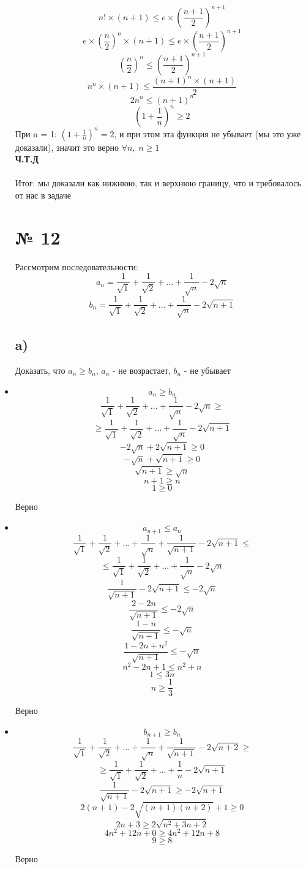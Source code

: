 \documentclass[a4paper,12pt]{article}
\begin{document}
\begin{itemize}
\[\]
\[
n! \times (n+1) \leq e \times \left(\frac{n+1}{2}\right)^{n+1}
\]
\[
e \times \left( \frac{n}{2}\right) ^ n \times (n+1) \leq e \times \left(\frac{n+1}{2}\right)^{n+1}
\]
\[
\left( \frac{n}{2}\right) ^ n \leq  \left(\frac{n+1}{2}\right)^{n+1}
\]
\[
n^n \times (n+1) \leq \frac{(n+1)^n \times(n+1)}{2}
\]
\[
2n^n \leq (n+1)^n
\]
\[
\left(1+\frac{1}{n}\right) ^ n \geq 2
\]
При n = 1: $\left(1+\frac{1}{n}\right) ^ n = 2$, и при этом эта функция не убывает (мы это уже доказали), значит это верно $\forall n, \; n \geq 1$\\
\textbf{Ч.Т.Д}
\\\\
Итог: мы доказали как нижнюю, так и верхнюю границу, что и требовалось от нас в задаче
\section*{№ 12}
Рассмотрим последовательности:
\[
a_n = \frac{1}{\sqrt{1}} + \frac{1}{\sqrt{2}} + \ldots + \frac{1}{\sqrt{n}} - 2\sqrt{n}
\]
\[
b_n = \frac{1}{\sqrt{1}} + \frac{1}{\sqrt{2}} + \ldots + \frac{1}{\sqrt{n}} -2 \sqrt{n+1}
\]
\subsection*{a)}
Доказать, что $a_n \geq b_n $, $a_n$ - не возрастает, $b_n$ - не убывает
\item \[
a_n \geq b_n
\]
\[
\frac{1}{\sqrt{1}} + \frac{1}{\sqrt{2}} + \ldots + \frac{1}{\sqrt{n}} - 2\sqrt{n} \geq
\]
\[
\geq \frac{1}{\sqrt{1}} + \frac{1}{\sqrt{2}} + \ldots + \frac{1}{\sqrt{n}} -2 \sqrt{n+1}
\]
\[
-2\sqrt{n} + 2\sqrt{n+1} \geq 0
\]
\[
-\sqrt{n} + \sqrt{n+1} \geq 0
\]
\[
\sqrt{n+1} \geq \sqrt{n}
\]
\[
n+1 \geq n
\]
\[
1 \geq 0
\]
\begin{center}
Верно
\end{center}
\item
\[
a_{n+1} \leq a_n
\]
\[
\frac{1}{\sqrt{1}} + \frac{1}{\sqrt{2}} + \ldots + \frac{1}{\sqrt{n}} + \frac{1}{\sqrt{n+1}}- 2\sqrt{n+1} \leq 
\]
\[
\leq \frac{1}{\sqrt{1}} + \frac{1}{\sqrt{2}} + \ldots + \frac{1}{\sqrt{n}} -2 \sqrt{n}
\]
\[
\frac{1}{\sqrt{n+1}} - 2 \sqrt{n+1} \leq -2\sqrt{n}
\]
\[
\frac{2-2n}{\sqrt{n+1}} \leq -2 \sqrt{n}
\]
\[
\frac{1-n}{\sqrt{n+1}} \leq -\sqrt{n}
\]
\[
\frac{1-2n+n^2}{\sqrt{n+1}} \leq -\sqrt{n}
\]
\[
n^2-2n+1 \leq n^2+n
\]
\[
1 \leq 3n
\]
\[
n \geq \frac{1}{3}
\]
\begin{center}
Верно
\end{center}
\item
\[
b_{n+1} \geq b_n
\]
\[
\frac{1}{\sqrt{1}} + \frac{1}{\sqrt{2}} + \ldots + \frac{1}{\sqrt{n}} + \frac{1}{\sqrt{n+1}} - 2\sqrt{n+2} \geq
\]
\[
\geq \frac{1}{\sqrt{1}} + \frac{1}{\sqrt{2}} + \ldots + \frac{1}{n} - 2\sqrt{n+1}
\]
\[
\frac{1}{\sqrt{n+1}} - 2\sqrt{n+1} \geq -2 \sqrt{n+1}
\]
\[
2(n+1) - 2\sqrt{(n+1)(n+2)} +1 \geq 0
\]
\[
2n+3 \geq 2 \sqrt{n^2 +3n + 2}
\]
\[
4n^2 + 12n + 0 \geq 4n^2 + 12n + 8
\]
\[
9 \geq 8
\]
\begin{center}
Верно
\end{center}

\end{itemize}
\end{document}
